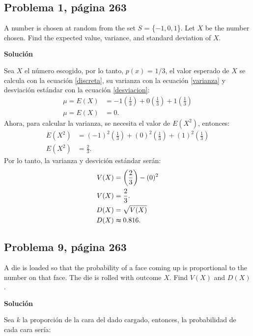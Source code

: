 \documentclass{article}
\begin{document}
\subsection{Problema 1, página 263}
A number is chosen at random from the set $S$ = \{$-1, 0, 1$\}. Let $X$ be the number chosen. Find the expected value, variance, and standard deviation of $X$.

\noindent \textbf{Solución}

\noindent Sea $X$ el número escogido, por lo tanto, $p(x)$ = $1/3$, el valor esperado de $X$ se calcula con la ecuación \ref{discreta}, su varianza con la ecuación \ref{varianza} y desviación estándar con la ecuación \ref{desviacion}:
\begin{align}
\nonumber
\mu = E{(X)}    & = -1\left(\frac{1}{3}\right) + 0\left(\frac{1}{3}\right) + 1\left(\frac{1}{3}\right)  \\  \nonumber
\mu = E{(X)}    & = 0.
\end{align}
Ahora, para calcular la varianza, se necesita el valor de $E(X^2)$, entonces:
\begin{align}
\nonumber
E{(X^2)}    & = (-1)^2\left(\frac{1}{3}\right) + (0)^2\left(\frac{1}{3}\right) + (1)^2\left(\frac{1}{3}\right)  \\ \nonumber
E{(X^2)}    & = \frac{2}{3}.
\end{align}
Por lo tanto, la varianza y desvición estándar serán:
\begin{align}
V{(X)} & = \left(\frac{2}{3}\right) - (0)^2 \\ \nonumber
V{(X)} & = \frac{2}{3}. \\ \nonumber
D{(X)} & = \sqrt{V(X)} \\ \nonumber
D{(X)} & \thickapprox 0.816. 
\end{align}

\subsection{Problema 9, página 263}
A die is loaded so that the probability of a face coming up is proportional to the number on that face. The die is rolled with outcome $X$. Find $V(X)$ and $D(X)$.

\noindent \textbf{Solución}

\noindent Sea $k$ la proporción de la cara del dado cargado, entonces, la probabilidad de cada cara sería: 
\end{document}
